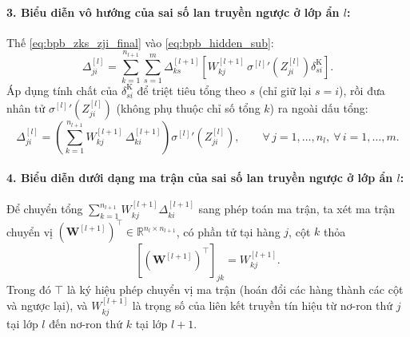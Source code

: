 \paragraph{3. Biểu diễn vô hướng của sai số lan truyền ngược ở lớp ẩn $l$:}
Thế \eqref{eq:bpb_zks_zji_final} vào \eqref{eq:bpb_hidden_sub}:
\begin{equation}
\Delta_{ji}^{[l]} = \sum_{k=1}^{n_{l+1}}\sum_{s=1}^{m} \Delta_{ks}^{[l+1]}\left[ W_{kj}^{[l+1]}\,{\sigma^{[l]}}'\!\left(Z_{ji}^{[l]}\right)\delta^{\mathrm{K}}_{si} \right].
\end{equation}
Áp dụng tính chất của $\delta^{\mathrm{K}}_{si}$ để triệt tiêu tổng theo $s$ (chỉ giữ lại $s = i$), rồi đưa nhân tử ${\sigma^{[l]}}'\!\left(Z_{ji}^{[l]}\right)$ (không phụ thuộc chỉ số tổng $k$) ra ngoài dấu tổng:
\begin{equation}
\Delta_{ji}^{[l]} = \left( \sum_{k=1}^{n_{l+1}} W_{kj}^{[l+1]}\,\Delta_{ki}^{[l+1]} \right){\sigma^{[l]}}'\!\left(Z_{ji}^{[l]}\right),
\qquad \forall\, j = 1,\dots,n_l,\ \forall\, i = 1,\dots,m.
\label{eq:bpb_second_scalar}
\end{equation}
 
\paragraph{4. Biểu diễn dưới dạng ma trận của sai số lan truyền ngược ở lớp ẩn $l$:}
Để chuyển tổng $\sum_{k=1}^{n_{l+1}} W_{kj}^{[l+1]}\Delta_{ki}^{[l+1]}$ sang phép toán ma trận, ta xét ma trận chuyển vị $\left(\mathbf{W}^{[l+1]}\right)^{\top} \in \mathbb{R}^{n_l \times n_{l+1}}$, có phần tử tại hàng $j$, cột $k$ thỏa
\begin{equation}
\left[\left(\mathbf{W}^{[l+1]}\right)^{\top}\right]_{jk} = W_{kj}^{[l+1]}.
\end{equation}
Trong đó $\top$ là ký hiệu phép chuyển vị ma trận (hoán đổi các hàng thành các cột và ngược lại), và $W_{kj}^{[l+1]}$ là trọng số của liên kết truyền tín hiệu từ nơ-ron thứ $j$ tại lớp $l$ đến nơ-ron thứ $k$ tại lớp $l+1$.
 
